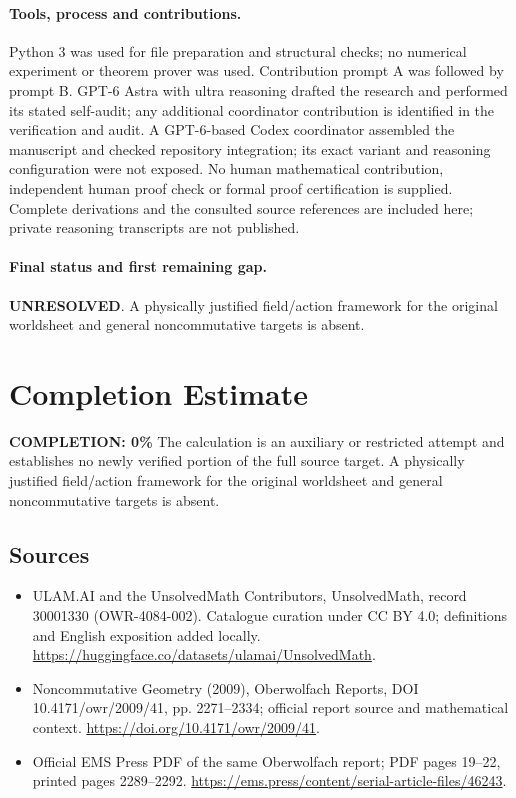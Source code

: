 \documentclass[11pt]{article}
\begin{document}
\paragraph{Tools, process and contributions.}
Python 3 was used for file preparation and structural checks; no numerical experiment or theorem prover was used. Contribution prompt A was followed by prompt B. GPT-6 Astra with ultra reasoning drafted the research and performed its stated self-audit; any additional coordinator contribution is identified in the verification and audit. A GPT-6-based Codex coordinator assembled the manuscript and checked repository integration; its exact variant and reasoning configuration were not exposed. No human mathematical contribution, independent human proof check or formal proof certification is supplied. Complete derivations and the consulted source references are included here; private reasoning transcripts are not published.

\paragraph{Final status and first remaining gap.}
\textbf{UNRESOLVED}. A physically justified field/action framework for the original worldsheet and general noncommutative targets is absent.

\section{Completion Estimate}
\noindent\textbf{COMPLETION: 0\%}
The calculation is an auxiliary or restricted attempt and establishes no newly verified portion of the full source target. A physically justified field/action framework for the original worldsheet and general noncommutative targets is absent.

\subsection{Sources}
\begin{itemize}
\item[\hypertarget{source:30001330:1}{S1}] ULAM.AI and the UnsolvedMath Contributors, UnsolvedMath, record 30001330 (OWR-4084-002). Catalogue curation under CC BY 4.0; definitions and English exposition added locally.
\url{https://huggingface.co/datasets/ulamai/UnsolvedMath}.
\item[\hypertarget{source:30001330:2}{S2}] Noncommutative Geometry (2009), Oberwolfach Reports, DOI 10.4171/owr/2009/41, pp. 2271--2334; official report source and mathematical context.
\url{https://doi.org/10.4171/owr/2009/41}.
\item[\hypertarget{source:30001330:3}{S3}] Official EMS Press PDF of the same Oberwolfach report; PDF pages 19--22, printed pages 2289--2292.
\url{https://ems.press/content/serial-article-files/46243}.
\end{itemize}
\label{end:30001330}
\end{document}
